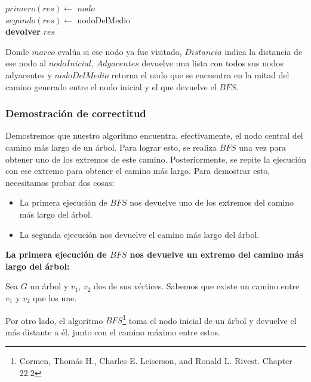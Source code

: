 \begin{itemize}
\begin{algorithm}[H]
{	    
	}
    
    $primero(res) \leftarrow$ $nodo$\\
    $segundo(res) \leftarrow$ nodoDelMedio\\
    
	\textbf{devolver} $res$
\end{algorithm}

Donde $marco$ evalúa si ese nodo ya fue visitado, $Distancia$ indica la distancia de ese nodo al $nodoInicial$, $Adyacentes$ devuelve una lista con todos sus nodos adyacentes y $nodoDelMedio$ retorna el nodo que se encuentra en la mitad del camino generado entre el nodo inicial y el que devuelve el $BFS$.

\subsubsection{Demostración de correctitud}
Demostremos que nuestro algoritmo encuentra, efectivamente, el nodo central del camino más largo de un árbol. Para lograr esto, se realiza $BFS$ una vez para obtener uno de los extremos de este camino. Posteriormente, se repite la ejecución con ese extremo para obtener el camino más largo.\newline
Para demostrar esto, necesitamos probar dos cosas: 
\begin {itemize}
\item La primera ejecución de $BFS$ nos devuelve uno de los extremos del camino más largo del árbol.
\item La segunda ejecución nos devuelve el camino más largo del árbol.
\end{itemize}
\newline
\textbf{La primera ejecución de $BFS$ nos devuelve un extremo del camino más largo del árbol:} \newline

Sea $G$ un árbol y $v_{1}$, $v_{2}$ dos de sus vértices. Sabemos que existe un camino entre $v_{1}$ y $v_{2}$ que los une.

 Por otro lado, el algoritmo $BFS$\footnote{Cormen, Thomás H., Charles E. Leiserson, and Ronald L. Rivest. Chapter 22.2} toma el nodo inicial de un árbol y devuelve el más distante a él, junto con el camino máximo entre estos.\newline


\end{itemize}
